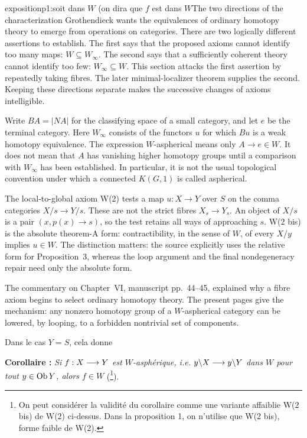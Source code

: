 \begin{dcomment}{exposition}{p1:soit dans $W$ (on dira que $f$ est dans $W$}{The two directions of the characterization}
Grothendieck wants the equivalences of ordinary homotopy theory to emerge from operations on categories. There are two logically different assertions to establish. The first says that the proposed axioms cannot identify too many maps: \(W\subseteq W_\infty\). The second says that a sufficiently coherent theory cannot identify too few: \(W_\infty\subseteq W\). This section attacks the first assertion by repeatedly taking fibres. The later minimal-localizer theorem supplies the second. Keeping these directions separate makes the successive changes of axioms intelligible.

Write \(BA=|NA|\) for the classifying space of a small category, and let \(e\) be the terminal category. Here \(W_\infty\) consists of the functors \(u\) for which \(Bu\) is a weak homotopy equivalence. The expression \(W\)-aspherical means only \(A\to e\in W\). It does not mean that \(A\) has vanishing higher homotopy groups until a comparison with \(W_\infty\) has been established. In particular, it is not the usual topological convention under which a connected \(K(G,1)\) is called aspherical.

The local-to-global axiom W(2) tests a map \(u:X\to Y\) over \(S\) on the comma categories \(X/s\to Y/s\). These are not the strict fibres \(X_s\to Y_s\). An object of \(X/s\) is a pair \((x,p(x)\to s)\), so the test retains all ways of approaching \(s\). W(2 bis) is the absolute theorem-A form: contractibility, in the sense of \(W\), of every \(X/y\) implies \(u\in W\). The distinction matters: the source explicitly uses the relative form for Proposition~3, whereas the loop argument and the final nondegeneracy repair need only the absolute form.

The commentary on Chapter~VI, manuscript pp.~44--45, explained why a fibre axiom begins to select ordinary homotopy theory. The present pages give the mechanism: any nonzero homotopy group of a \(W\)-aspherical category can be lowered, by looping, to a forbidden nontrivial set of components.
\end{dcomment}




Dans le cas $Y = S$, cela donne

\textbf{Corollaire :} \textit{Si $f : X \longrightarrow Y$ est $W$-asphérique, i.e. $y\backslash X \longrightarrow y\backslash Y$} \textit{dans $W$ pour tout $y \in \operatorname{Ob} Y$, alors $f \in W$} (\footnote{On peut considérer la validité du corollaire comme une variante affaiblie W(2 bis) de W(2) ci-dessus. Dans la proposition 1, on n'utilise que W(2 bis), forme faible de W(2).}).

